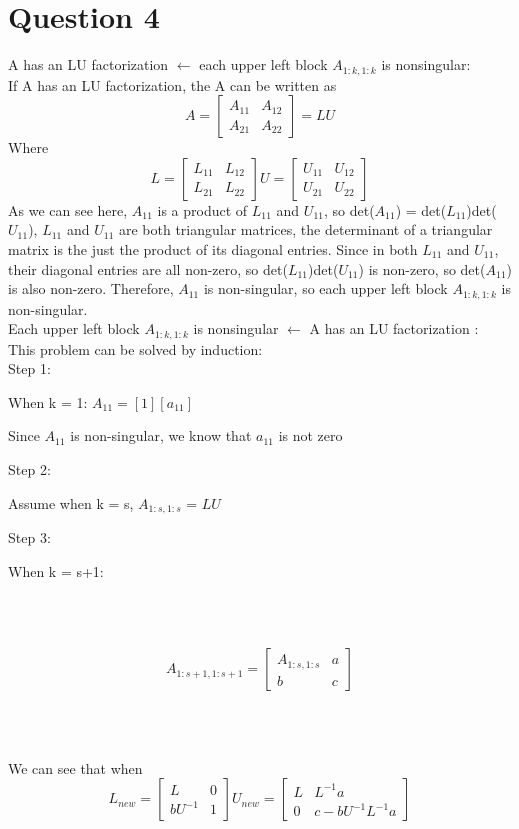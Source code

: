 \documentclass[11pt]{article} %
\begin{document}
\section{Question 4}
A has an LU factorization $\gets$ each upper left block $A_{1:k,1:k}$ is nonsingular:\\
If A has an LU factorization, the A can be written as\\
\[
A  =
  \begin{bmatrix}
    A_{11} & A_{12}  \\
    A_{21} & A_{22} 
  \end{bmatrix} = LU
\]Where
\[
L =
  \begin{bmatrix}
    L_{11} & L_{12}  \\
    L_{21} & L_{22} 
  \end{bmatrix}
  U =
  \begin{bmatrix}
    U_{11} & U_{12}  \\
    U_{21} & U_{22} 
  \end{bmatrix}
\]
As we can see here, $A_{11}$ is a product of $L_{11}$ and $U_{11}$,
so det($A_{11}$) = det($L_{11}$)det($U_{11}$), $L_{11}$ and $U_{11}$ are both triangular matrices, the determinant of a triangular matrix is the just the product of its diagonal entries. Since in both $L_{11}$ and $U_{11}$, their diagonal entries are all non-zero, so det($L_{11}$)det($U_{11}$) is non-zero, so det($A_{11}$) is also non-zero. Therefore, $A_{11}$ is non-singular, so each upper left block $A_{1:k,1:k}$ is non-singular.\\\linebreak
Each upper left block $A_{1:k,1:k}$ is nonsingular $\gets$ A has an LU factorization :\\
This problem can be solved by induction:\\
Step 1:\\
\centerline{When k = 1: $A_{11} = [1][a_{11}]$}
\centerline{Since $A_{11}$ is non-singular, we know that $a_{11}$ is not zero}
Step 2:\\
\centerline{Assume when k = s, $A_{1:s,1:s}$ = $LU$}
Step 3:\\
\centerline{When k = s+1:}\\\\
\centerline{\[
A_{1:s+1,1:s+1}  =
  \begin{bmatrix}
    A_{1:s,1:s} & a  \\
    b & c 
  \end{bmatrix}
\]}\\\\
\centerline{We can see that when \[
L_{new} =
  \begin{bmatrix}
    L & 0  \\
    bU^{-1} & 1 
  \end{bmatrix}
  U_{new}  =
  \begin{bmatrix}
    L & L^{-1}a \\
    0 & c - bU^{-1}L^{-1}a
  \end{bmatrix}
\]}\\\\
\end{document}
